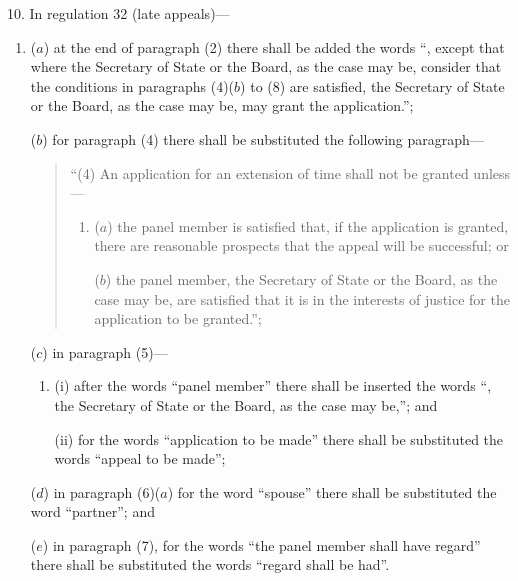 \documentclass[12pt,a4paper]{article}
\begin{document}
10.  In regulation 32 (late appeals)—
\begin{enumerate}\item[]
($a$) at the end of paragraph (2) there shall be added the words “, except that where the Secretary of State or the Board, as the case may be, consider that the conditions in paragraphs (4)($b$)  to (8) are satisfied, the Secretary of State or the Board, as the case may be, may grant the application.”;

($b$) for paragraph (4) there shall be substituted the following paragraph—
\begin{quotation}
“(4) An application for an extension of time shall not be granted unless—
\begin{enumerate}\item[]
($a$) the panel member is satisfied that, if the application is granted, there are reasonable prospects that the appeal will be successful; or

($b$) the panel member, the Secretary of State or the Board, as the case may be, are satisfied that it is in the interests of justice for the application to be granted.”;
\end{enumerate}
\end{quotation}

($c$) in paragraph (5)—
\begin{enumerate}\item[]
(i) after the words “panel member” there shall be inserted the words “, the Secretary of State or the Board, as the case may be,”; and

(ii) for the words “application to be made” there shall be substituted the words “appeal to be made”;
\end{enumerate}

($d$) in paragraph (6)($a$)  for the word “spouse” there shall be substituted the word “partner”; and

($e$) in paragraph (7), for the words “the panel member shall have regard” there shall be substituted the words “regard shall be had”.
\end{enumerate}

\medskip
\end{document}
